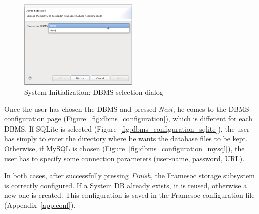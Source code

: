 \documentclass[twoside]{article}
\begin{document}
\begin{sloppypar}
\begin{figure}[h!]
  \centering
    \includegraphics[width=0.5\textwidth]{images/dbms_selection.png}
  \caption{System Initialization: DBMS selection dialog}
  \label{fig:dbms_selection}
\end{figure}

Once the user has chosen the DBMS and pressed \emph{Next}, he comes to the DBMS configuration page (Figure~\ref{fig:dbms_configuration}), which is different for each DBMS.
If SQLite is selected (Figure~\ref{fig:dbms_configuration_sqlite}), the user has simply to enter the directory where he wants the database files to be kept.
Otherwise, if MySQL is chosen (Figure~\ref{fig:dbms_configuration_mysql}), the user has to specify some connection parameters (user-name, password, URL).

In both cases, after successfully pressing \emph{Finish}, the Framesoc storage subsystem is correctly configured. 
If a System DB already exists, it is reused, otherwise a new one is created.
This configuration is saved in the Framesoc configuration file (Appendix~\ref{app:conf}). 


\end{sloppypar}
\end{document}
